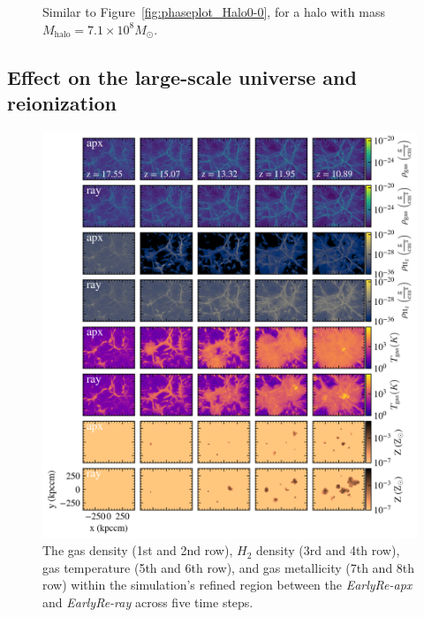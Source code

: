 \documentclass[linenumbers, twocolumn]{aastex631}
\begin{document}
\begin{figure}
    \caption{Similar to Figure~\ref{fig:phaseplot_Halo0-0}, for a halo with mass $M_{\mathrm{halo}} = 7.1\times 10^{8} M_\odot$.}
    \label{fig:phaseplot_Halo18-19}
\end{figure}


\subsection{Effect on the large-scale universe and reionization}

\begin{figure}
    \centering
    \includegraphics[width=\textwidth]{EarlyRe/gas_surface_density_multiple_ver1088_ver2.png}
    \caption{The gas density (1st and 2nd row), $H_{2}$ density (3rd and 4th row), gas temperature (5th and 6th row), and gas metallicity (7th and 8th row) within the simulation's refined region between the \textit{EarlyRe-apx} and \textit{EarlyRe-ray} across five time steps.}
    \label{fig:gas_surface_density_wholebox}
\end{figure}
\end{document}
